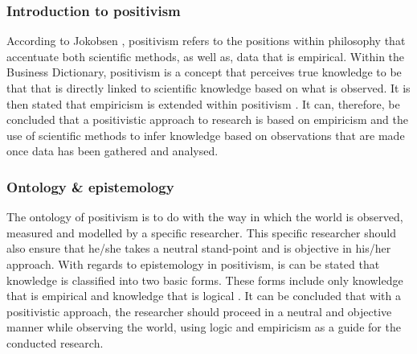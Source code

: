 \subsubsection{Introduction to positivism} 
According to Jokobsen \cite{Jakobsen2013}, positivism refers to the positions within philosophy that accentuate both scientific methods, as well as, data that is empirical. Within the Business Dictionary, positivism is a concept that perceives true knowledge to be that that is directly linked to scientific knowledge based on what is observed. It is then stated that empiricism is extended within positivism \cite{BusinessDictionary}. 
It can, therefore, be concluded that a positivistic approach to research is based on empiricism and the use of scientific methods to infer knowledge based on observations that are made once data has been gathered and analysed.
\subsubsection{Ontology \& epistemology}
The ontology of positivism is to do with the way in which the world is observed, measured and modelled by a specific researcher. This specific researcher should also ensure that he/she takes a neutral stand-point and is objective in his/her approach. 
With regards to epistemology in positivism, is can be stated that knowledge is classified into two basic forms. These forms include only knowledge that is empirical and knowledge that is logical \cite{OatesJ2006}.
It can be concluded that with a positivistic approach, the researcher should proceed in a neutral and objective manner while observing the world, using logic and empiricism as a guide for the conducted research.
